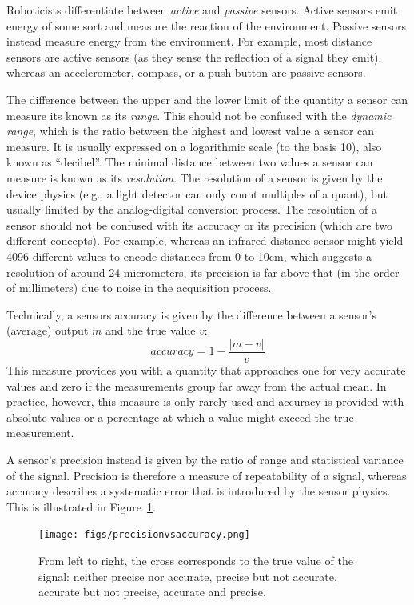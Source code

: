 Roboticists differentiate between \emph{active} and \emph{passive} sensors. Active sensors  emit energy of some sort and measure the reaction of the environment. Passive sensors  instead measure energy from the environment. For example, most distance sensors are active sensors (as they sense the reflection of a signal they emit), whereas an accelerometer, compass, or a push-button are passive sensors.

The difference between the upper and the lower limit of the quantity a sensor can measure its known as its \emph{range}. This should not be confused with the  \emph{dynamic range}, which is the ratio between the highest and lowest value a sensor can measure. It is usually expressed on a logarithmic scale (to the basis 10), also known as ``decibel''. The minimal distance between two values a sensor can measure is known as its  \emph{resolution}. The resolution of a sensor is given by the device physics (e.g., a light detector can only count multiples of a quant), but usually limited by the analog-digital conversion process. The resolution of a sensor should not be confused with its accuracy or its precision (which are two different concepts). For example, whereas an infrared distance sensor might yield 4096 different values to encode distances from 0 to 10cm, which suggests a resolution of around 24 micrometers, its precision is far above that (in the order of millimeters) due to noise in the acquisition process.

Technically, a sensors accuracy  is given by the difference between a sensor's (average) output $m$ and the true value $v$:
\begin{equation}
accuracy=1-\frac{|m-v|}{v}
\end{equation}
This measure provides you with a quantity that approaches one for very accurate values and zero if the measurements group far away from the actual mean. In practice, however, this measure is only rarely used and accuracy is provided with absolute values or a percentage at which a value might exceed the true measurement.

A sensor's precision  instead is given by the ratio of range and statistical variance of the signal. Precision is therefore a measure of repeatability of a signal, whereas accuracy describes a systematic error that is introduced by the sensor physics. This is illustrated in Figure~\ref{fig:precision}.
\begin{figure}
	\centering
		\texttt{[image: figs/precisionvsaccuracy.png]}
	\caption{From left to right, the cross corresponds to the true value of the signal: neither precise nor accurate, precise but not accurate, accurate but not precise, accurate and precise.
	\label{fig:precision}}
\end{figure}

